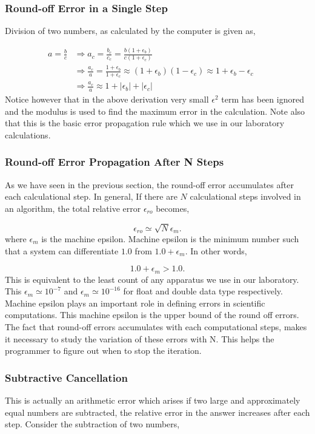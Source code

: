 \documentclass[a4,12pt]{article}
\numberwithin{equation}{subsection}
\begin{document}
\subsubsection{Round-off Error in a Single Step}
Division of two numbers, as calculated by the computer is given as,

\begin{align}
a=\frac{b}{c} & \Rightarrow a_c = \frac{b_c}{c_c} = \frac{b(1+\epsilon_b)}{c(1+\epsilon_c)} && \\
& \Rightarrow \frac{a_c}{a} = \frac{1+\epsilon_b}{1+\epsilon_c} \approx (1+\epsilon_b)(1-\epsilon_c) \approx 1+ \epsilon_b - \epsilon_c &&\\
& \Rightarrow \frac{a_c}{a} \approx 1 + |\epsilon_b| + |\epsilon_c| &&
\end{align}
Notice however that in the above derivation very small $\epsilon^2$ term has been ignored and the modulus is used to find the maximum error in the calculation. Note also that this is the basic error propagation rule which we use in our laboratory calculations.

\subsubsection{Round-off Error Propagation After N Steps}
As we have seen in the previous section, the round-off error accumulates after each calculational step. In general, If there are $N$ calculational steps involved in an algorithm, the total relative error $\epsilon_{ro}$ becomes,

$$\epsilon_{ro} \simeq \sqrt N \epsilon_m.$$
where $\epsilon_m$ is the machine epsilon. Machine epsilon is the minimum number such that a system can differentiate $1.0$ from $1.0+\epsilon_m$. In other words,

$$1.0 + \epsilon_m > 1.0.$$
 This is equivalent to the least count of any apparatus we use in our laboratory. This $\epsilon_m \simeq 10^{-7}$ and $\epsilon_m \simeq 10^{-16}$ for float and double data type respectively. Machine epsilon plays an important role in defining errors in scientific computations. This machine epsilon is the upper bound of the round off errors.
\newline
The fact that round-off errors accumulates with each computational steps, makes it necessary to study the variation of these errors with N. This helps the programmer to figure out when to stop the iteration.

\subsubsection{Subtractive Cancellation}
This is actually an arithmetic error which arises if two large and approximately equal numbers are subtracted, the relative error in the answer increases after each step. Consider the subtraction of two numbers,
\end{document}
